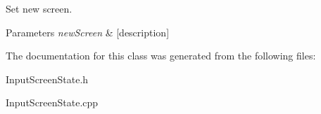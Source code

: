 Set new screen. 


\begin{DoxyParams}{Parameters}
{\em new\+Screen} & \mbox{[}description\mbox{]} \\
\hline
\end{DoxyParams}


The documentation for this class was generated from the following files\+:\begin{DoxyCompactItemize}
\item 
Input\+Screen\+State.\+h\item 
Input\+Screen\+State.\+cpp\end{DoxyCompactItemize}

